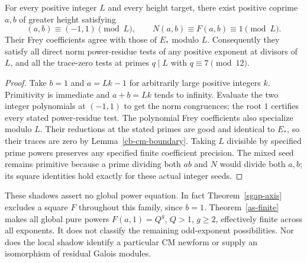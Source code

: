 \begin{theorem}\label{cb-local-shadows}
For every positive integer $L$ and every height target, there exist
positive coprime $a,b$ of greater height satisfying
\[
 (a,b)\equiv(-1,1)\pmod L,
 \qquad N(a,b)\equiv F(a,b)\equiv1\pmod L.
\]
Their Frey coefficients agree with those of $E_*$ modulo $L$.
Consequently they satisfy all direct norm power-residue tests of any
positive exponent at divisors of $L$, and all the trace-zero tests
at primes $q\mid L$ with $q\equiv7\pmod{12}$.
\end{theorem}
\begin{proof}
Take $b=1$ and $a=Lk-1$ for arbitrarily large positive integers $k$.
Primitivity is immediate and $a+b=Lk$ tends to infinity. Evaluate the
two integer polynomials at $(-1,1)$ to get the norm congruences;
the root $1$ certifies every stated power-residue test. The polynomial
Frey coefficients also specialize modulo $L$. Their reductions at
the stated primes are good and identical to $E_*$, so their traces
are zero by Lemma~\ref{cb-cm-boundary}.
Taking $L$ divisible by specified prime powers preserves any specified
finite coefficient precision. The mixed seed remains primitive because
a prime dividing both $ab$ and $N$ would divide both $a,b$; its square
identities hold exactly for these actual integer seeds.
\end{proof}

These shadows assert no global power equation. In fact
Theorem~\ref{sgap-axis} excludes a square $F$ throughout this family,
since $b=1$. Theorem~\ref{as-finite} makes all global pure powers
$F(a,1)=Q^g$, $Q>1$, $g\ge2$, effectively finite across all
exponents. It does not classify the remaining odd-exponent possibilities.
Nor does the local shadow identify a particular CM newform or supply
an isomorphism of residual Galois modules.

